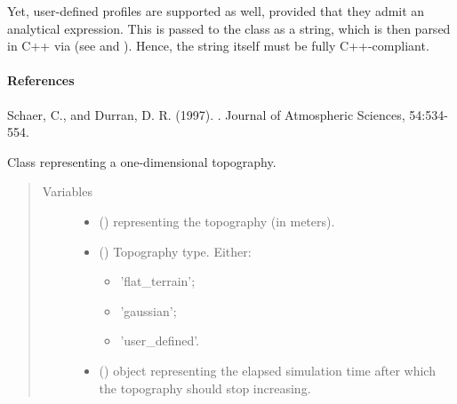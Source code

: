 \documentclass[letterpaper,10pt,english]{sphinxmanual}
\begin{document}
Yet, user-defined profiles are supported as well, provided that they admit an analytical expression.
This is passed to the class as a string, which is then parsed in C++ via 
(see  and ). Hence, the string itself must be
fully C++-compliant.
\paragraph{References}

Schaer, C., and Durran, D. R. (1997). . Journal of Atmospheric Sciences, 54:534-554.

\begin{fulllineitems}
\label{\detokenize{api:grids.topography.Topography1d}}
Class representing a one-dimensional topography.
\begin{quote}\begin{description}
\item[{Variables}] \leavevmode\begin{itemize}
\item {} 
 () \textendash{}  representing the topography (in meters).

\item {} 
 () \textendash{} 
Topography type. Either:
\begin{itemize}
\item {} 
’flat\_terrain’;

\item {} 
’gaussian’;

\item {} 
’user\_defined’.

\end{itemize}


\item {} 
 () \textendash{}  object representing the elapsed simulation time after which the topography
should stop increasing.


\end{itemize}
\end{description}
\end{quote}
\end{fulllineitems}
\end{document}
